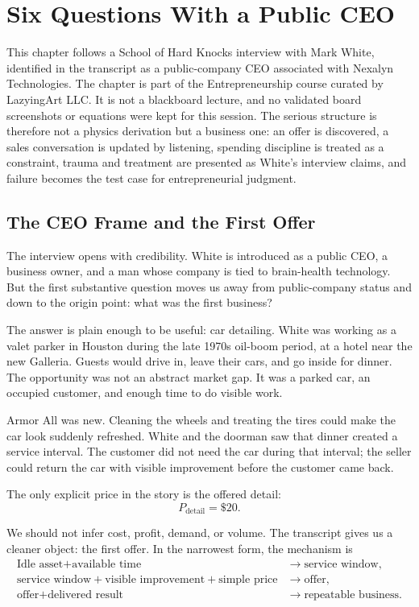 \chapter{Six Questions With a Public CEO}

This chapter follows a School of Hard Knocks interview with Mark White, identified in the transcript as a public-company CEO associated with Nexalyn Technologies. The chapter is part of the Entrepreneurship course curated by LazyingArt LLC. It is not a blackboard lecture, and no validated board screenshots or equations were kept for this session. The serious structure is therefore not a physics derivation but a business one: an offer is discovered, a sales conversation is updated by listening, spending discipline is treated as a constraint, trauma and treatment are presented as White's interview claims, and failure becomes the test case for entrepreneurial judgment.

\section{The CEO Frame and the First Offer}

The interview opens with credibility. White is introduced as a public CEO, a business owner, and a man whose company is tied to brain-health technology. But the first substantive question moves us away from public-company status and down to the origin point: what was the first business?

The answer is plain enough to be useful: car detailing. White was working as a valet parker in Houston during the late 1970s oil-boom period, at a hotel near the new Galleria. Guests would drive in, leave their cars, and go inside for dinner. The opportunity was not an abstract market gap. It was a parked car, an occupied customer, and enough time to do visible work.

Armor All was new. Cleaning the wheels and treating the tires could make the car look suddenly refreshed. White and the doorman saw that dinner created a service interval. The customer did not need the car during that interval; the seller could return the car with visible improvement before the customer came back.

The only explicit price in the story is the offered detail:
\begin{equation}
P_{\text{detail}}=\$20.
\end{equation}

We should not infer cost, profit, demand, or volume. The transcript gives us a cleaner object: the first offer. In the narrowest form, the mechanism is
\begin{align}
\text{Idle asset}+\text{available time}
&\longrightarrow \text{service window},\\
\text{service window}+\text{visible improvement}+\text{simple price}
&\longrightarrow \text{offer},\\
\text{offer}+\text{delivered result}
&\longrightarrow \text{repeatable business}.
\end{align}

